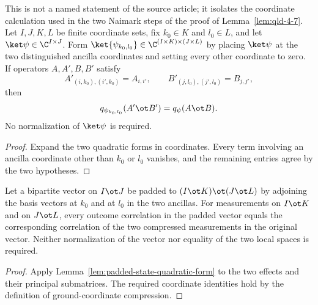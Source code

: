 	\begin{lemma}
		\label{lem:padded-state-quadratic-form}
		\leanok
		This is not a named statement of the source article; it isolates the
		coordinate calculation used in the two Naimark steps of the proof of
		Lemma~\ref{lem:qld-4-7}. Let $I,J,K,L$ be finite coordinate sets, fix
		$k_0\in K$ and $l_0\in L$, and let $\ket\psi\in\C^{I\times J}$. Form
		$\ket{\psi_{k_0,l_0}}\in\C^{(I\times K)\times(J\times L)}$ by placing
		$\ket\psi$ at the two distinguished ancilla coordinates and setting every
		other coordinate to zero. If operators $A,A',B,B'$ satisfy
		\[
			A'_{(i,k_0),(i',k_0)}=A_{i,i'},\qquad
			B'_{(j,l_0),(j',l_0)}=B_{j,j'},
		\]
		then
		\[
			q_{\psi_{k_0,l_0}}(A'\ot B')=q_\psi(A\ot B).
		\]
		No normalization of $\ket\psi$ is required.
	\end{lemma}
	\begin{proof}
		\leanok
		Expand the two quadratic forms in coordinates. Every term involving an
		ancilla coordinate other than $k_0$ or $l_0$ vanishes, and the remaining
		entries agree by the two hypotheses.
	\end{proof}

	\begin{lemma}
		\label{lem:ground-compress-correlation}
		\leanok
		Let a bipartite vector on $I \ot J$ be padded to $(I \ot K) \ot (J \ot L)$
		by adjoining the basis vectors at $k_0$ and at $l_0$ in the two ancillas.
		For measurements on $I \ot K$ and on $J \ot L$, every outcome correlation
		in the padded vector equals the corresponding correlation of the two
		compressed measurements in the original vector. Neither normalization of
		the vector nor equality of the two local spaces is required.
	\end{lemma}
	\begin{proof}
		\leanok
		Apply Lemma~\ref{lem:padded-state-quadratic-form} to the two effects and
		their principal submatrices. The required coordinate identities hold by
		the definition of ground-coordinate compression.
	\end{proof}

